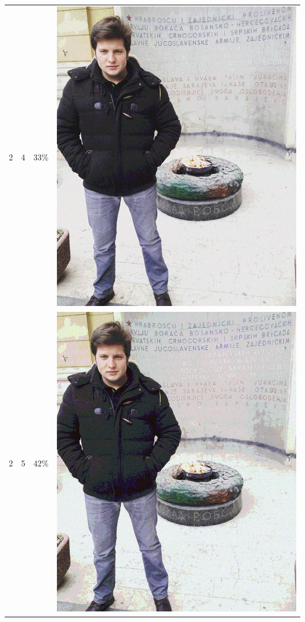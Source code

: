\documentclass[times, utf8, seminar, numeric]{fer}
\begin{document}
\begin{center}
\begin{longtable}{|c|c|c|c|}
2 & 4 &33\% & \includegraphics[scale=0.3]{../benchmark_results/pattern/2_components-4_bits.png} \\
2 & 5 &42\% & \includegraphics[scale=0.3]{../benchmark_results/pattern/2_components-5_bits.png} \\

\end{longtable}
\end{center}
\end{document}
